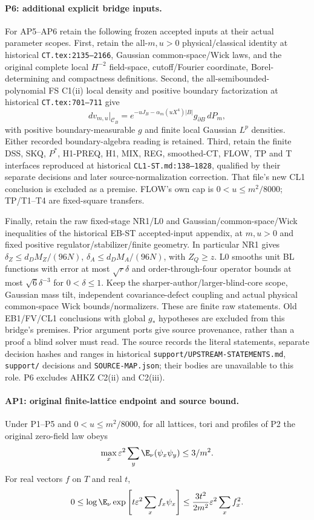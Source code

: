 \paragraph{P6: additional explicit bridge inputs.}
For AP5--AP6 retain the following frozen accepted inputs at their actual
parameter scopes. First, retain the all-$m,u>0$ physical/classical identity
at historical \texttt{CT.tex:2135--2166}, Gaussian common-space/Wick laws,
and the original complete local $H^{-2}$ field-space, cutoff/Fourier
coordinate, Borel-determining and compactness definitions.
Second, the all-semibounded-polynomial FS C1(ii) local density and positive
boundary factorization at historical \texttt{CT.tex:701--711} give
\[
 dv_{m,u}|_{\mathcal C_B}
 =e^{-uJ_B-\alpha_m(uX^4)|B|}g_{\partial B}\,dP_m,
\]
with positive boundary-measurable $g$ and finite local Gaussian $L^p$
densities. Either recorded boundary-algebra reading is retained.
Third, retain the finite DSS, SKQ, $P^*$, H1-PREQ, H1, MIX, REG, smoothed-CT, FLOW,
TP and T interfaces reproduced at historical \texttt{CL1-ST.md:138--1828},
qualified by their separate decisions and later source-normalization
correction. That file's new CL1 conclusion is excluded as a premise.
FLOW's own cap is $0<u\le m^2/8000$; TP/T1--T4 are fixed-square transfers.

Finally, retain the raw fixed-stage NR1/L0 and Gaussian/common-space/Wick
inequalities of the historical EB-ST accepted-input appendix, at $m,u>0$
and fixed positive regulator/stabilizer/finite geometry. In particular
NR1 gives $\delta_Z\le d_D M_Z/(96N)$,
$\delta_A\le d_D M_A/(96N)$, with $Z_Q\ge z$.
L0 smooths unit BL functions with error at most $\sqrt r\delta$ and
order-through-four operator bounds at most $\sqrt6\delta^{-3}$ for
$0<\delta\le1$. Keep the sharper-author/larger-blind-core scope, Gaussian
mass tilt, independent covariance-defect coupling and actual physical
common-space Wick bounds/normalizers. These are finite raw statements.
Old EB1/FV/CL1 conclusions with global $g_*$ hypotheses are excluded from
this bridge's premises. Prior argument ports give source provenance,
rather than a proof a blind solver must read. The source records the
literal statements, separate decision hashes and ranges in historical
\texttt{support/UPSTREAM-STATEMENTS.md}, \texttt{support/} decisions and
\texttt{SOURCE-MAP.json}; their bodies are unavailable to this role.
P6 excludes AHKZ C2(ii) and C2(iii).

\paragraph{AP1: original finite-lattice endpoint and source bound.}
Under P1--P5 and $0<u\le m^2/8000$, for all lattices, tori and profiles
of P2 the original zero-field law obeys
\[
 \max_x\varepsilon^2\sum_y\E_\nu(\psi_x\psi_y)\le3/m^2.
\]
For real vectors $f$ on $T$ and real $t$,
\[
 0\le\log\E_\nu\exp\left[t\varepsilon^2\sum_xf_x\psi_x\right]
       \le\frac{3t^2}{2m^2}\varepsilon^2\sum_xf_x^2.
\]

